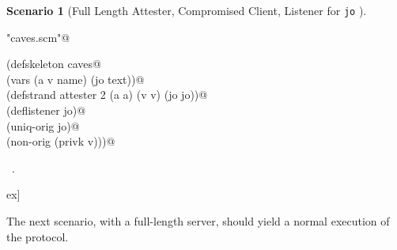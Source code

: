 \documentclass[titlepage,12pt]{article}
\theoremstyle{definition}
\newtheorem{scenario}{Scenario}
\begin{document}
\begin{scenario}[Full Length Attester, Compromised Client,
Listener for \texttt{jo} ]\label{scene:full jo listener}
\begin{flushleft} \small
\begin{minipage}{\linewidth} \label{scrap28}
\verb@"caves.scm"@\nobreak\ {\footnotesize {} }
\vspace{-1ex}
\begin{list}{}{} \item
\mbox{}\verb@(defskeleton caves@\\
\mbox{}\verb@  (vars (a v name) (jo text))@\\
\mbox{}\verb@  (defstrand attester 2 (a a) (v v) (jo jo))@\\
\mbox{}\verb@  (deflistener jo)@\\
\mbox{}\verb@  (uniq-orig jo)@\\
\mbox{}\verb@  (non-orig (privk v)))@{\NWsep}
\end{list}
\vspace{-1ex}
\footnotesize\addtolength{\baselineskip}{-1ex}
\begin{list}{}{\setlength{\itemsep}{-\parsep}\setlength{\itemindent}{-\leftmargin}}
\item \NWtxtFileDefBy\ .
\end{list}
\end{minipage}\4ex]
\end{flushleft}
\end{scenario}

The next scenario, with a full-length server, should yield a
normal execution of the protocol.
\end{document}
